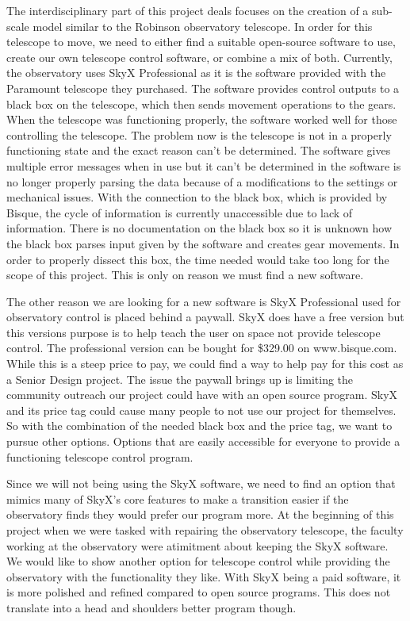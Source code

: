 \documentclass[12pt]{article}
\begin{document}
The interdisciplinary part of this project deals focuses on the creation of a sub-scale model similar to the Robinson observatory telescope. In order for this telescope to move, we need to either find a suitable open-source software to use, create our own telescope control software, or combine a mix of both. Currently, the observatory uses SkyX Professional as it is the software provided with the Paramount telescope they purchased. The software provides control outputs to a black box on the telescope, which then sends movement operations to the gears. When the telescope was functioning properly, the software worked well for those controlling the telescope. The problem now is the telescope is not in a properly functioning state and the exact reason can’t be determined. The software gives multiple error messages when in use but it can’t be determined in the software is no longer properly parsing the data because of a modifications to the settings or mechanical issues. With the connection to the black box, which is provided by Bisque, the cycle of information is currently unaccessible due to lack of information. There is no documentation on the black box so it is unknown how the black box parses input given by the software and creates gear movements. In order to properly dissect this box, the time needed would take too long for the scope of this project. This is only on reason we must find a new software.

The other reason we are looking for a new software is SkyX Professional used for observatory control is placed behind a paywall. SkyX does have a free version but this versions purpose is to help teach the user on space not provide telescope control. The professional version can be bought for \$329.00 on www.bisque.com. While this is a steep price to pay, we could find a way to help pay for this cost as a Senior Design project. The issue the paywall brings up is limiting the community outreach our project could have with an open source program. SkyX and its price tag could cause many people to not use our project for themselves. So with the combination of the needed black box and the price tag, we want to pursue other options. Options that are easily accessible for everyone to provide a functioning telescope control program.

Since we will not being using the SkyX software, we need to find an option that mimics many of SkyX’s core features to make a transition easier if the observatory finds they would prefer our program more. At the beginning of this project when we were tasked with repairing the observatory telescope, the faculty working at the observatory were atimitment about keeping the SkyX software. We would like to show another option for telescope control while providing the observatory with the functionality they like. With SkyX being a paid software, it is more polished and refined compared to open source programs. This does not translate into a head and shoulders better program though.
\end{document}
